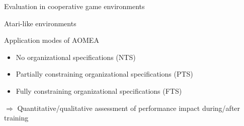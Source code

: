 \begin{frame}{Evaluation in cooperative game environments}
\begin{block}{Atari-like environments}
    \end{block}

    \begin{block}{Application modes of AOMEA}
        \begin{itemize}
            \item No organizational specifications (NTS)
            \item Partially constraining organizational specifications (PTS)
            \item Fully constraining organizational specifications (FTS)
        \end{itemize}
    \end{block}

    $\Longrightarrow$ Quantitative/qualitative assessment of performance impact during/after training

\end{frame}

